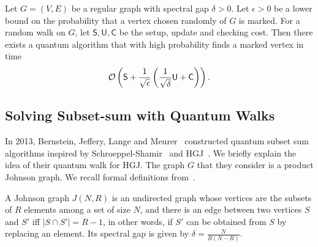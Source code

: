 \begin{theorem}\label{thm:qwgraph}
Let $G=(V,E)$ be a regular graph with spectral gap $\delta>0$. Let $\epsilon>0$ be a lower bound on the probability that a vertex chosen randomly of $G$ is marked. For a random walk on $G$, let $\mathsf{S},\mathsf{U}, \mathsf{C}$ be the setup, update and checking cost. Then there exists a quantum algorithm that with high probability finds a marked vertex in time $$ \mathcal{O} \left( \mathsf{S} + \frac{1}{\sqrt{\epsilon}} \left( \frac{1}{\sqrt{\delta}}\mathsf{U} + \mathsf{C} \right) \right) .$$
\end{theorem}





\subsection{Solving Subset-sum with Quantum Walks}\label{subsection:subsumqw}

In 2013, Bernstein, Jeffery, Lange and Meurer~\cite{DBLP:conf/pqcrypto/BernsteinJLM13} constructed quantum subset sum algorithms inspired by Schroeppel-Shamir~\cite{DBLP:journals/siamcomp/SchroeppelS81} and HGJ~\cite{DBLP:conf/eurocrypt/Howgrave-GrahamJ10}. We briefly explain the idea of their quantum walk for HGJ. The graph $G$ that they consider is a product Johnson graph. We recall formal definitions from~\cite{DBLP:conf/pqcrypto/KachigarT17}.

\begin{definition}
A Johnson graph $J(N,R)$ is an undirected graph whose vertices are the subsets of $R$ elements among a set of size $N$, and there is an edge between two vertices $S$ and $S'$ iff $|S \cap S'| = R-1$, in other words, if $S'$ can be obtained from $S$ by replacing an element. Its spectral gap is given by $\delta = \frac{N}{R(N-R)}$.
\end{definition}

